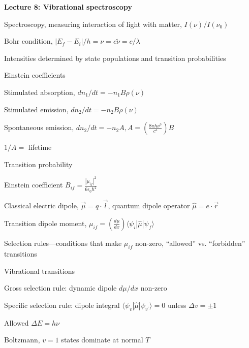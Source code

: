 \message{ !name(Outline.tex)}\documentclass[11pt]{article}
\begin{document}
\begin{outline}
\item{{\bf Lecture 8: Vibrational spectroscopy}}
  \begin{outline}
    \item Spectroscopy, measuring interaction of light with matter, $I(\nu)/I(\nu_0)$
    \item Bohr condition, $|E_f-E_i|/h=\nu =c\tilde{\nu}=c/\lambda$
    \item Intensities determined by state populations and transition probabilities
    \item Einstein coefficients
      \begin{outline}
        \item Stimulated absorption, $dn_1/dt= -n_1 B\rho(\nu)$
        \item Stimulated emission, $dn_2/dt= -n_2 B\rho(\nu)$
        \item Spontaneous emission, $dn_2/dt=-n_2 A, A=\left ( \frac{8\pi h
              \nu^3}{c^3}\right )B$
        \item $1/A=$ lifetime
      \end{outline}

    \item Transition probability
      \begin{outline}
        \item Einstein coefficient $B_{if}=\frac{|\mu_{if}|^2}{6\epsilon_0\hbar^2}$
        \item Classical electric dipole, $\overrightarrow{\mu}=q \cdot
          \overrightarrow{l}$, quantum dipole operator $\hat\mu = e\cdot \overrightarrow{r}$
        \item Transition dipole moment, $\mu_{if} = \left(
        \frac{d\mu}{dx}\right ) \langle \psi_i|\hat\mu |\psi_f \rangle $
    \item Selection rules---conditions that make $\mu_{if}$ non-zero,
      ``allowed'' vs. ``forbidden'' transitions
      \end{outline}

    \item Vibrational transitions
      \begin{outline}
        \item Gross selection rule: dynamic dipole $d\mu/dx$ non-zero
        \item Specific selection rule: dipole integral $\langle \psi_v|\hat\mu|\psi_{v^\prime} \rangle =0$
          unless $\Delta v = \pm 1$
        \item Allowed $\Delta E = h\nu$
        \item Boltzmann, $v=1$ states dominate at normal $T$
      \end{outline}


\end{outline}
\end{outline}
\end{document}
